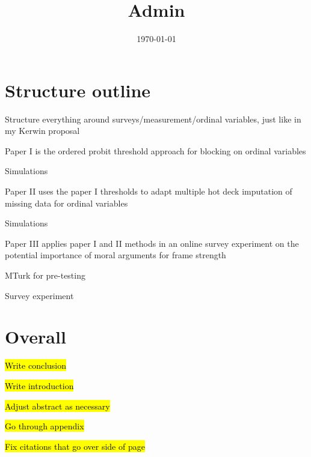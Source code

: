 \documentclass[12pt]{article}
\title{Admin}
\date{\today}
\begin{document}
\maketitle


\section*{Structure outline}
	\begin{coi}
		\item Structure everything around surveys/measurement/ordinal variables, just like in my Kerwin proposal
		\item Paper I is the ordered probit threshold approach for blocking on ordinal variables
			\begin{coi}
				\item Simulations
			\end{coi}
		\item Paper II uses the paper I thresholds to adapt multiple hot deck imputation of missing data for ordinal variables
			\begin{coi}
				\item Simulations
			\end{coi}
		\item Paper III applies paper I and II methods in an online survey experiment on the potential importance of moral arguments for frame strength
			\begin{coi}
				\item MTurk for pre-testing
				\item Survey experiment
			\end{coi}
	\end{coi}


\section*{Overall}
	\begin{coi}
		\item \hl{Write conclusion}
		\item \hl{Write introduction}
		\item \hl{Adjust abstract as necessary}
		\item \hl{Go through appendix}
		\item \hl{Fix citations that go over side of page}
	\end{coi}
	
\end{document}
